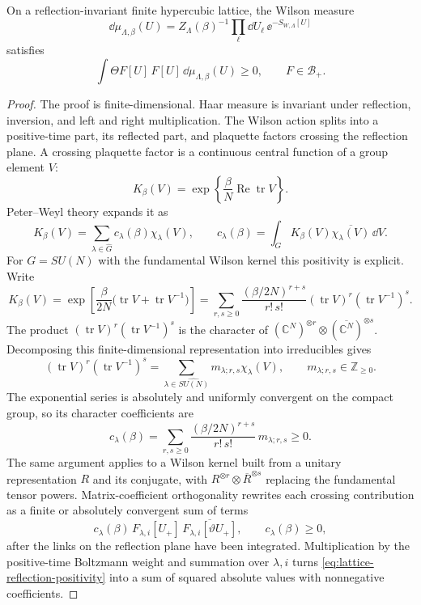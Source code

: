 \begin{theorem}
\label{thm:lattice-wilson-reflection-positivity}
On a reflection-invariant finite hypercubic lattice, the Wilson measure
\[
  \dd\mu_{\Lambda,\beta}(U)
  =
  Z_{\Lambda}(\beta)^{-1}
  \prod_{\ell}\dd U_\ell\,\ee^{-S_{W,\Lambda}[U]}
\]
satisfies
\begin{equation}
  \int \Theta F[U]\,F[U]\,\dd\mu_{\Lambda,\beta}(U)\geq0,
  \qquad
  F\in\mathcal B_+.
  \label{eq:lattice-reflection-positivity}
\end{equation}
\end{theorem}

\begin{proof}
The proof is finite-dimensional.  Haar measure is invariant under reflection,
inversion, and left and right multiplication.  The Wilson action splits into a
positive-time part, its reflected part, and plaquette factors crossing the
reflection plane.  A crossing plaquette factor is a continuous central
function of a group element \(V\):
\[
  K_\beta(V)
  =
  \exp\left\{\frac{\beta}{N}
  \operatorname{Re}\operatorname{tr}V\right\}.
\]
Peter--Weyl theory expands it as
\begin{equation}
  K_\beta(V)
  =
  \sum_{\lambda\in\widehat G}c_\lambda(\beta)\chi_\lambda(V),
  \qquad
  c_\lambda(\beta)
  =
  \int_G K_\beta(V)\overline{\chi_\lambda(V)}\,\dd V .
  \label{eq:lattice-peter-weyl-crossing-kernel}
\end{equation}
For \(G=SU(N)\) with the fundamental Wilson kernel this positivity is
explicit.  Write
\[
  K_\beta(V)
  =
  \exp\left[
    \frac{\beta}{2N}
    \bigl(\operatorname{tr}V+\operatorname{tr}V^{-1}\bigr)
  \right]
  =
  \sum_{r,s\geq0}
  \frac{(\beta/2N)^{r+s}}{r!\,s!}
  (\operatorname{tr}V)^r(\operatorname{tr}V^{-1})^s .
\]
The product
\((\operatorname{tr}V)^r(\operatorname{tr}V^{-1})^s\) is the character of
\((\mathbb C^N)^{\otimes r}\otimes(\overline{\mathbb C^N})^{\otimes s}\).
Decomposing this finite-dimensional representation into irreducibles gives
\[
  (\operatorname{tr}V)^r(\operatorname{tr}V^{-1})^s
  =
  \sum_{\lambda\in\widehat{SU(N)}}
  m_{\lambda;r,s}\chi_\lambda(V),
  \qquad
  m_{\lambda;r,s}\in\mathbb Z_{\geq0}.
\]
The exponential series is absolutely and uniformly convergent on the compact
group, so its character coefficients are
\[
  c_\lambda(\beta)
  =
  \sum_{r,s\geq0}
  \frac{(\beta/2N)^{r+s}}{r!\,s!}\,m_{\lambda;r,s}
  \geq0 .
\]
The same argument applies to a Wilson kernel built from a unitary
representation \(R\) and its conjugate, with \(R^{\otimes r}\otimes
\overline R^{\otimes s}\) replacing the fundamental tensor powers.
Matrix-coefficient orthogonality rewrites
each crossing contribution as a finite or absolutely convergent sum of terms
\[
  c_\lambda(\beta)\,
  F_{\lambda,i}[U_+]\,\overline{F_{\lambda,i}[\vartheta U_+]},
  \qquad c_\lambda(\beta)\geq0,
\]
after the links on the reflection plane have been integrated.  Multiplication
by the positive-time Boltzmann weight and summation over \(\lambda,i\) turns
\eqref{eq:lattice-reflection-positivity} into a sum of squared absolute values
with nonnegative coefficients.
\end{proof}

